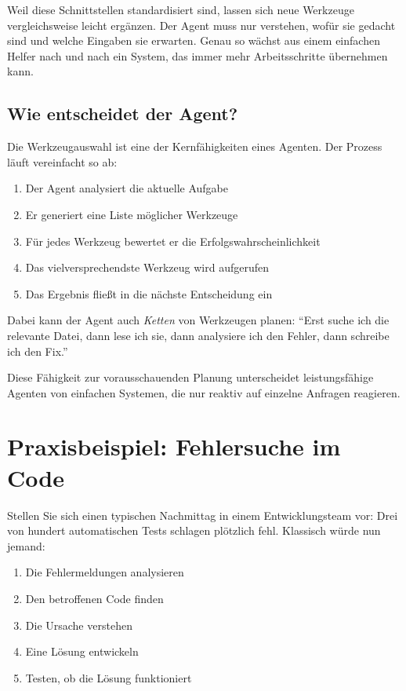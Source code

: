 Weil diese Schnittstellen standardisiert sind, lassen sich neue Werkzeuge vergleichsweise leicht ergänzen. Der Agent muss nur verstehen, wofür sie gedacht sind und welche Eingaben sie erwarten. Genau so wächst aus einem einfachen Helfer nach und nach ein System, das immer mehr Arbeitsschritte übernehmen kann.

\subsection{Wie entscheidet der Agent?}

Die Werkzeugauswahl ist eine der Kernfähigkeiten eines Agenten. Der Prozess läuft vereinfacht so ab:

\begin{enumerate}
  \item Der Agent analysiert die aktuelle Aufgabe
  \item Er generiert eine Liste möglicher Werkzeuge
  \item Für jedes Werkzeug bewertet er die Erfolgswahrscheinlichkeit
  \item Das vielversprechendste Werkzeug wird aufgerufen
  \item Das Ergebnis fließt in die nächste Entscheidung ein
\end{enumerate}

Dabei kann der Agent auch \emph{Ketten} von Werkzeugen planen: \enquote{Erst suche ich die relevante Datei, dann lese ich sie, dann analysiere ich den Fehler, dann schreibe ich den Fix.}

Diese Fähigkeit zur vorausschauenden Planung unterscheidet leistungsfähige Agenten von einfachen Systemen, die nur reaktiv auf einzelne Anfragen reagieren.


\section{Praxisbeispiel: Fehlersuche im Code}

Stellen Sie sich einen typischen Nachmittag in einem Entwicklungsteam vor: Drei von hundert automatischen Tests schlagen plötzlich fehl. Klassisch würde nun jemand:

\begin{enumerate}
  \item Die Fehlermeldungen analysieren
  \item Den betroffenen Code finden
  \item Die Ursache verstehen
  \item Eine Lösung entwickeln
  \item Testen, ob die Lösung funktioniert
\end{enumerate}

